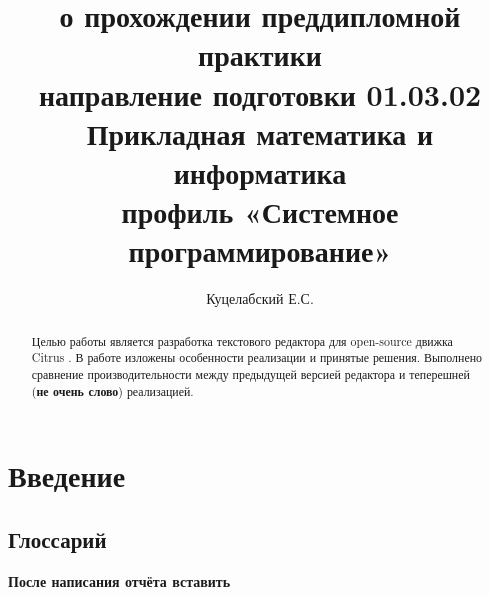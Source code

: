 \documentclass{fefu}
\begin{document}
	\title{о прохождении преддипломной практики\\направление подготовки 01.03.02 Прикладная математика и информатика\\профиль «Системное программирование»}
	\author{Куцелабский Е.С.}
	
	\makereporttitle
	\tableofcontents
	\newpage
	
	\begin{abstract}
		\par Целью работы является разработка текстового редактора для 
		open-source движка Citrus \cite{CitrusRepo}. 
		В работе изложены особенности реализации и принятые решения.
		Выполнено сравнение производительности между предыдущей версией редактора и
		теперешней (\textbf{не очень слово}) реализацией.
	\end{abstract}

	\section{Введение}
		\subsection{Глоссарий}
			\textbf{После написания отчёта вставить}		
\end{document}
